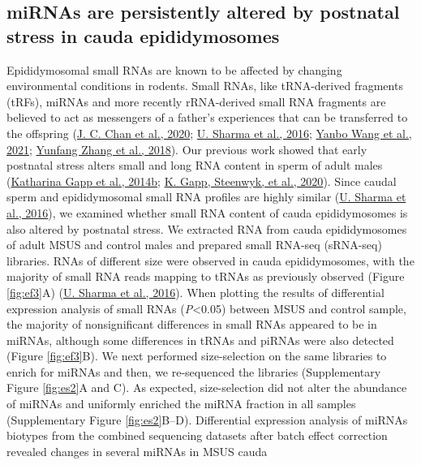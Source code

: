 \documentclass[12pt,twoside]{reedthesis}
\begin{document}
\hypertarget{mirnas-are-persistently-altered-by-postnatal-stress-in-cauda-epididymosomes}{%
\subsection{miRNAs are persistently altered by postnatal stress in cauda epididymosomes}\label{mirnas-are-persistently-altered-by-postnatal-stress-in-cauda-epididymosomes}}

Epididymosomal small RNAs are known to be affected by changing
environmental conditions in rodents. Small RNAs, like tRNA-derived
fragments (tRFs), miRNAs and more recently rRNA-derived small RNA
fragments are believed to act as messengers of a father's experiences
that can be transferred to the offspring (\protect\hyperlink{ref-chan_2020}{J. C. Chan et al., 2020}; \protect\hyperlink{ref-sharma_2016}{U. Sharma et al., 2016}; \protect\hyperlink{ref-wang_2021}{Yanbo Wang et al., 2021}; \protect\hyperlink{ref-zhang_2018}{Yunfang Zhang et al., 2018}). Our previous work showed that early postnatal
stress alters small and long RNA content in sperm of adult males
(\protect\hyperlink{ref-gapp_2014}{Katharina Gapp et al., 2014b}; \protect\hyperlink{ref-gapp_2020}{K. Gapp, Steenwyk, et al., 2020}). Since caudal sperm and epididymosomal small RNA
profiles are highly similar (\protect\hyperlink{ref-sharma_2016}{U. Sharma et al., 2016}), we examined whether small RNA
content of cauda epididymosomes is also altered by postnatal stress. We
extracted RNA from cauda epididymosomes of adult MSUS and control males
and prepared small RNA-seq (sRNA-seq) libraries. RNAs of different size
were observed in cauda epididymosomes, with the majority of small RNA
reads mapping to tRNAs as previously observed (Figure \ref{fig:ef3}A)
(\protect\hyperlink{ref-sharma_2016}{U. Sharma et al., 2016}). When plotting the results of differential expression
analysis of small RNAs (\emph{P}\textless0.05) between MSUS and control sample, the
majority of nonsignificant differences in small RNAs appeared to be in
miRNAs, although some differences in tRNAs and piRNAs were also detected
(Figure \ref{fig:ef3}B). We next performed size-selection on the same libraries to
enrich for miRNAs and then, we re-sequenced the libraries
(Supplementary Figure \ref{fig:es2}A and C). As expected, size-selection did not
alter the abundance of miRNAs and uniformly enriched the miRNA fraction
in all samples (Supplementary Figure \ref{fig:es2}B--D). Differential expression
analysis of miRNAs biotypes from the combined sequencing datasets after
batch effect correction revealed changes in several miRNAs in MSUS cauda
\end{document}
